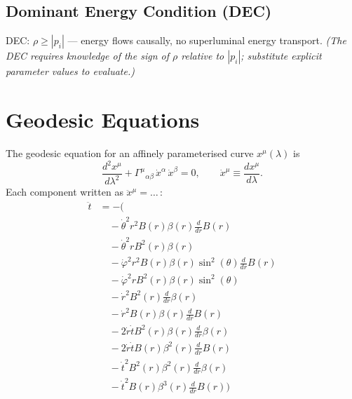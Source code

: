 \documentclass[11pt,a4paper]{article}
\newcommand{\christoffel}[3]{\Gamma^{#1}{}_{#2 #3}}
\begin{document}
\subsection{Dominant Energy Condition (DEC)}
DEC: $\rho \geq |p_i|$ — energy flows causally, no superluminal energy transport.
\textit{(The DEC requires knowledge of the sign of $\rho$ relative to $|p_i|$; substitute explicit parameter values to evaluate.)}
\section{Geodesic Equations}
The geodesic equation for an affinely parameterised curve $x^\mu(\lambda)$ is
\begin{equation}
  \frac{d^2 x^\mu}{d\lambda^2} + \christoffel{\mu}{\alpha}{\beta}\,\dot{x}^\alpha\,\dot{x}^\beta = 0,\qquad \dot{x}^\mu \equiv \frac{dx^\mu}{d\lambda}.
\end{equation}
Each component written as $\ddot{x}^\mu = \ldots\,:$
\begin{align*}
  \ddot{t} &= -( \\
  &\quad - \dot{\theta}^{2} r^{2} B{\left(r \right)} \beta{\left(r \right)} \frac{d}{d r} B{\left(r \right)} \\
  &\quad - \dot{\theta}^{2} r B^{2}{\left(r \right)} \beta{\left(r \right)} \\
  &\quad - \dot{\varphi}^{2} r^{2} B{\left(r \right)} \beta{\left(r \right)} \sin^{2}{\left(\theta \right)} \frac{d}{d r} B{\left(r \right)} \\
  &\quad - \dot{\varphi}^{2} r B^{2}{\left(r \right)} \beta{\left(r \right)} \sin^{2}{\left(\theta \right)} \\
  &\quad - \dot{r}^{2} B^{2}{\left(r \right)} \frac{d}{d r} \beta{\left(r \right)} \\
  &\quad - \dot{r}^{2} B{\left(r \right)} \beta{\left(r \right)} \frac{d}{d r} B{\left(r \right)} \\
  &\quad - 2 \dot{r} \dot{t} B^{2}{\left(r \right)} \beta{\left(r \right)} \frac{d}{d r} \beta{\left(r \right)} \\
  &\quad - 2 \dot{r} \dot{t} B{\left(r \right)} \beta^{2}{\left(r \right)} \frac{d}{d r} B{\left(r \right)} \\
  &\quad - \dot{t}^{2} B^{2}{\left(r \right)} \beta^{2}{\left(r \right)} \frac{d}{d r} \beta{\left(r \right)} \\
  &\quad - \dot{t}^{2} B{\left(r \right)} \beta^{3}{\left(r \right)} \frac{d}{d r} B{\left(r \right)})
\end{align*}
\end{document}
